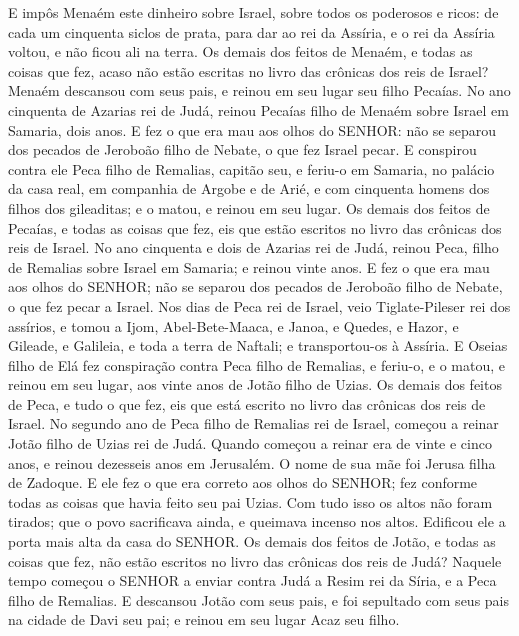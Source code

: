 {  E impôs Menaém este dinheiro sobre Israel, sobre todos os poderosos e ricos: de cada um cinquenta siclos de prata, para dar ao rei da Assíria, e o rei da Assíria voltou, e não ficou ali na terra.
  Os demais dos feitos de Menaém, e todas as coisas que fez, acaso não estão escritas no livro das crônicas dos reis de Israel?
  Menaém descansou com seus pais, e reinou em seu lugar seu filho Pecaías.
  No ano cinquenta de Azarias rei de Judá, reinou Pecaías filho de Menaém sobre Israel em Samaria, dois anos.
  E fez o que era mau aos olhos do SENHOR: não se separou dos pecados de Jeroboão filho de Nebate, o que fez Israel pecar.
  E conspirou contra ele Peca filho de Remalias, capitão seu, e feriu-o em Samaria, no palácio da casa real, em companhia de Argobe e de Arié, e com cinquenta homens dos filhos dos gileaditas; e o matou, e reinou em seu lugar.
  Os demais dos feitos de Pecaías, e todas as coisas que fez, eis que estão escritos no livro das crônicas dos reis de Israel.
  No ano cinquenta e dois de Azarias rei de Judá, reinou Peca, filho de Remalias sobre Israel em Samaria; e reinou vinte anos.
  E fez o que era mau aos olhos do SENHOR; não se separou dos pecados de Jeroboão filho de Nebate, o que fez pecar a Israel.
  Nos dias de Peca rei de Israel, veio Tiglate-Pileser rei dos assírios, e tomou a Ijom, Abel-Bete-Maaca, e Janoa, e Quedes, e Hazor, e Gileade, e Galileia, e toda a terra de Naftali; e transportou-os à Assíria.
  E Oseias filho de Elá fez conspiração contra Peca filho de Remalias, e feriu-o, e o matou, e reinou em seu lugar, aos vinte anos de Jotão filho de Uzias.
  Os demais dos feitos de Peca, e tudo o que fez, eis que está escrito no livro das crônicas dos reis de Israel.
  No segundo ano de Peca filho de Remalias rei de Israel, começou a reinar Jotão filho de Uzias rei de Judá.
  Quando começou a reinar era de vinte e cinco anos, e reinou dezesseis anos em Jerusalém. O nome de sua mãe foi Jerusa filha de Zadoque.
  E ele fez o que era correto aos olhos do SENHOR; fez conforme todas as coisas que havia feito seu pai Uzias.
  Com tudo isso os altos não foram tirados; que o povo sacrificava ainda, e queimava incenso nos altos. Edificou ele a porta mais alta da casa do SENHOR.
  Os demais dos feitos de Jotão, e todas as coisas que fez, não estão escritos no livro das crônicas dos reis de Judá?
  Naquele tempo começou o SENHOR a enviar contra Judá a Resim rei da Síria, e a Peca filho de Remalias.
  E descansou Jotão com seus pais, e foi sepultado com seus pais na cidade de Davi seu pai; e reinou em seu lugar Acaz seu filho.
\par }

